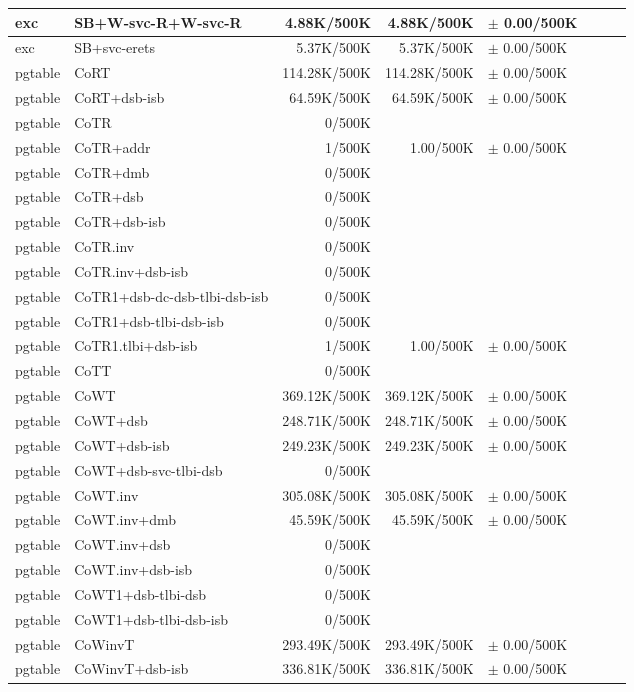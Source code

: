 \begin{tabular}{l l  | r r l | r r l}
\hline
   exc&SB+W-svc-R+W-svc-R&4.88K/500K&4.88K/500K&$\pm$ 0.00/500K&\\
\hline
   exc&SB+svc-erets&5.37K/500K&5.37K/500K&$\pm$ 0.00/500K&\\
\hline
   pgtable&CoRT&114.28K/500K&114.28K/500K&$\pm$ 0.00/500K&\\
\hline
   pgtable&CoRT+dsb-isb&64.59K/500K&64.59K/500K&$\pm$ 0.00/500K&\\
\hline
   pgtable&CoTR&0/500K&&&\\
\hline
   pgtable&CoTR+addr&1/500K&1.00/500K&$\pm$ 0.00/500K&\\
\hline
   pgtable&CoTR+dmb&0/500K&&&\\
\hline
   pgtable&CoTR+dsb&0/500K&&&\\
\hline
   pgtable&CoTR+dsb-isb&0/500K&&&\\
\hline
   pgtable&CoTR.inv&0/500K&&&\\
\hline
   pgtable&CoTR.inv+dsb-isb&0/500K&&&\\
\hline
   pgtable&CoTR1+dsb-dc-dsb-tlbi-dsb-isb&0/500K&&&\\
\hline
   pgtable&CoTR1+dsb-tlbi-dsb-isb&0/500K&&&\\
\hline
   pgtable&CoTR1.tlbi+dsb-isb&1/500K&1.00/500K&$\pm$ 0.00/500K&\\
\hline
   pgtable&CoTT&0/500K&&&\\
\hline
   pgtable&CoWT&369.12K/500K&369.12K/500K&$\pm$ 0.00/500K&\\
\hline
   pgtable&CoWT+dsb&248.71K/500K&248.71K/500K&$\pm$ 0.00/500K&\\
\hline
   pgtable&CoWT+dsb-isb&249.23K/500K&249.23K/500K&$\pm$ 0.00/500K&\\
\hline
   pgtable&CoWT+dsb-svc-tlbi-dsb&0/500K&&&\\
\hline
   pgtable&CoWT.inv&305.08K/500K&305.08K/500K&$\pm$ 0.00/500K&\\
\hline
   pgtable&CoWT.inv+dmb&45.59K/500K&45.59K/500K&$\pm$ 0.00/500K&\\
\hline
   pgtable&CoWT.inv+dsb&0/500K&&&\\
\hline
   pgtable&CoWT.inv+dsb-isb&0/500K&&&\\
\hline
   pgtable&CoWT1+dsb-tlbi-dsb&0/500K&&&\\
\hline
   pgtable&CoWT1+dsb-tlbi-dsb-isb&0/500K&&&\\
\hline
   pgtable&CoWinvT&293.49K/500K&293.49K/500K&$\pm$ 0.00/500K&\\
\hline
   pgtable&CoWinvT+dsb-isb&336.81K/500K&336.81K/500K&$\pm$ 0.00/500K&\\

\end{tabular}
